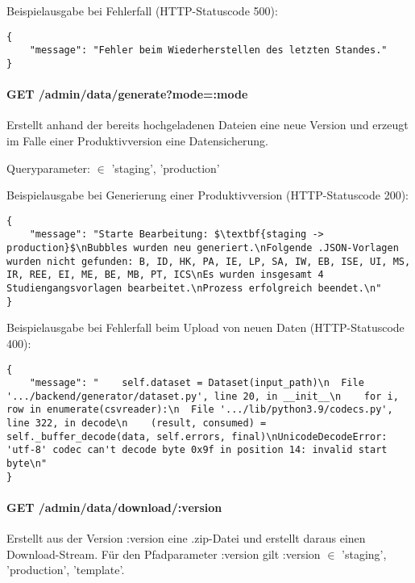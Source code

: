 \noindent
Beispielausgabe bei Fehlerfall (HTTP-Statuscode 500):
\begin{lstlisting}[style=Python]
{
    "message": "Fehler beim Wiederherstellen des letzten Standes."
}
\end{lstlisting}

\paragraph*{GET /admin/data/generate?mode=:mode}
\vspace{-1.0em}
Erstellt anhand der bereits hochgeladenen Dateien eine neue Version und erzeugt im Falle einer Produktivversion eine Datensicherung.

\noindent
Queryparameter:  $\in$ {'staging', 'production'}

\noindent
\begin{minipage}{\linewidth}
Beispielausgabe bei Generierung einer Produktivversion (HTTP-Statuscode 200):
\begin{lstlisting}[style=Python, mathescape=true]
{
    "message": "Starte Bearbeitung: $\textbf{staging -> production}$\nBubbles wurden neu generiert.\nFolgende .JSON-Vorlagen wurden nicht gefunden: B, ID, HK, PA, IE, LP, SA, IW, EB, ISE, UI, MS, IR, REE, EI, ME, BE, MB, PT, ICS\nEs wurden insgesamt 4 Studiengangsvorlagen bearbeitet.\nProzess erfolgreich beendet.\n"
}
\end{lstlisting}
\end{minipage}

\noindent
Beispielausgabe bei Fehlerfall beim Upload von neuen Daten (HTTP-Statuscode 400):
\begin{lstlisting}[style=Python]
{
    "message": "    self.dataset = Dataset(input_path)\n  File '.../backend/generator/dataset.py', line 20, in __init__\n    for i, row in enumerate(csvreader):\n  File '.../lib/python3.9/codecs.py', line 322, in decode\n    (result, consumed) = self._buffer_decode(data, self.errors, final)\nUnicodeDecodeError: 'utf-8' codec can't decode byte 0x9f in position 14: invalid start byte\n"
}
\end{lstlisting}

\paragraph*{GET /admin/data/download/:version}
\vspace{-1.0em}
Erstellt aus der Version :version eine .zip-Datei und erstellt daraus einen Download-Stream. Für den Pfadparameter :version gilt :version $\in$ {'staging', 'production', 'template'}.

